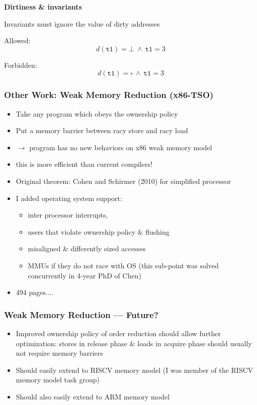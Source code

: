 \documentclass{beamer}
\begin{document}
\begin{frame} 
\textbf{Dirtiness \& invariants}

Invariants must ignore the value of dirty addresses

Allowed:
\[ d(\texttt{t1}) = \bot  \  \land \ \texttt{t1} = 3  \]

Forbidden:
\[ d(\texttt{t1}) = \square \ \land \ \texttt{t1} = 3 \]
\end{frame}


\begin{frame}
\frametitle{Other Work: Weak Memory Reduction (x86-TSO)}
\begin{itemize}
	\item Take any program which obeys the ownership policy
	\item Put a memory barrier between racy store and racy load
	\item $\to$ program has no new behaviors on x86 weak memory model
	\item this is more efficient than current compilers!
	\item Original theorem: Cohen and Schirmer (2010) for simplified processor
	\item<2-> I added operating system support: 
	\begin{itemize} 
		\item inter processor interrupts, 
		\item users that violate ownership policy \& flushing 
		\item misaligned \& differently sized accesses
		\item MMUs if they do not race with OS (this sub-point was solved concurrently in 4-year PhD of Chen)
	\end{itemize} 
	\item<3-> 494 pages....
\end{itemize}
\end{frame}


\begin{frame}
\frametitle{Weak Memory Reduction --- Future?}
\begin{itemize}
	\item Improved ownership policy of order reduction should allow further optimization:
	stores in release phase \& loads in acquire phase should usually not require memory barriers
	\item Should easily extend to RISCV memory model (I was member of the RISCV memory model task group)
	\item Should also easily extend to ARM memory model
\end{itemize}
\end{frame}
\end{document}
